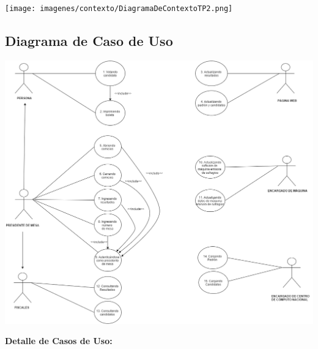 \documentclass[spanish, 10pt,a4paper]{article}
\numberwithin{equation}{section} %
\begin{document}
\vspace{\baselineskip}
    \begin{center}
                \texttt{[image: imagenes/contexto/DiagramaDeContextoTP2.png]}
                \\
                \vspace{1pt}
                \footnotesize\textit{}
        \end{center}
\vspace{\baselineskip}

\clearpage
\subsection{Diagrama de Caso de Uso}

\vspace{\baselineskip}
    \begin{center}
                \includegraphics[scale=0.40]{imagenes/CasosDeUso.png}
                \\
                \vspace{1pt}
                \footnotesize\textit{}
        \end{center}
\vspace{\baselineskip}

\newpage

\noindent\textbf{Detalle de Casos de Uso:}\\
\end{document}
